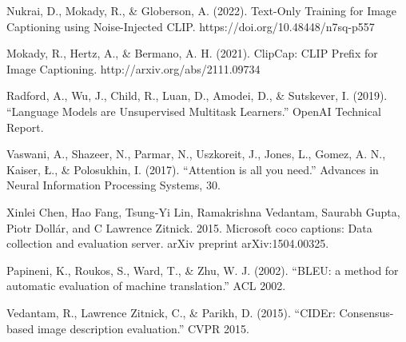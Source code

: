 \documentclass[11pt]{article}
\begin{document}
\pagebreak
\begin{thebibliography}{99}
    Nukrai, D., Mokady, R., \& Globerson, A. (2022). Text-Only Training for Image Captioning using Noise-Injected CLIP. https://doi.org/10.48448/n7sq-p557
    
    Mokady, R., Hertz, A., \& Bermano, A. H. (2021). ClipCap: CLIP Prefix for Image Captioning. http://arxiv.org/abs/2111.09734
    
    Radford, A., Wu, J., Child, R., Luan, D., Amodei, D., \& Sutskever, I. (2019). ``Language Models are Unsupervised Multitask Learners.'' OpenAI Technical Report.

    Vaswani, A., Shazeer, N., Parmar, N., Uszkoreit, J., Jones, L., Gomez, A. N., Kaiser, Ł., \& Polosukhin, I. (2017). ``Attention is all you need.'' 
    Advances in Neural Information Processing Systems, 30.

    Xinlei Chen, Hao Fang, Tsung-Yi Lin, Ramakrishna Vedantam, Saurabh Gupta, Piotr Dollár, and C Lawrence Zitnick. 2015. Microsoft coco captions: Data collection and evaluation server. arXiv preprint arXiv:1504.00325.
    
    Papineni, K., Roukos, S., Ward, T., \& Zhu, W. J. (2002). ``BLEU: a method for automatic evaluation of machine translation.'' ACL 2002.
    
    Vedantam, R., Lawrence Zitnick, C., \& Parikh, D. (2015). ``CIDEr: Consensus-based image description evaluation.'' CVPR 2015.
    
    \end{thebibliography}
\end{document}
